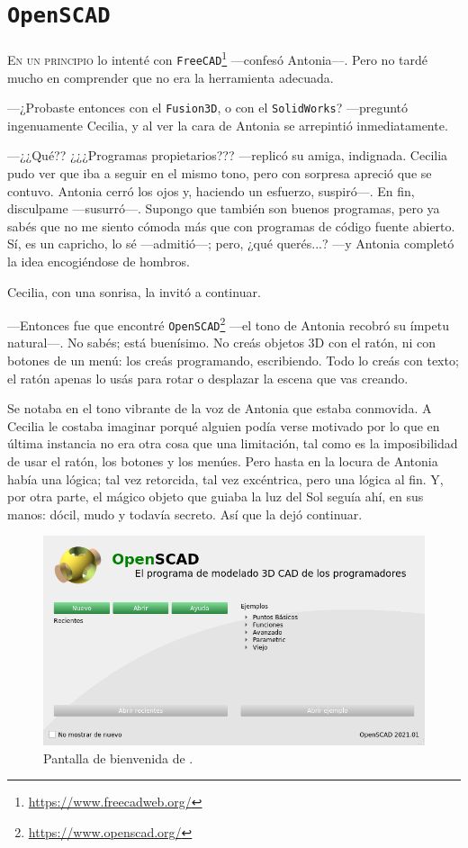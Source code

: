 \chapter[OpenSCAD]{\texttt{OpenSCAD}}

\lettrine[ante=\raisebox{-2ex}{\Large ---},lines=2]{E}{n un principio}
lo intenté con
\texttt{FreeCAD}\footnote{\url{https://www.freecadweb.org/}}
---confesó An\-to\-\mbox{nia---.} Pero no tardé mucho en comprender
que no era la herramienta adecuada.

---¿Probaste entonces con el \texttt{Fusion3D}, o con el
\texttt{Solid\-Works}? ---pre\-gun\-tó ingenuamente Cecilia, y al ver la
cara de Antonia se arrepintió inmediatamente.

---¿¿Qué??  ¿¿¿Programas propietarios???  ---replicó su amiga,
indignada. Cecilia pudo ver que iba a seguir en el mismo tono, pero
con sorpresa apreció que se contuvo. Antonia cerró los ojos y,
haciendo un esfuerzo, suspiró---. En fin, disculpame
---susurró---. Supongo que también son buenos programas, pero ya sabés
que no me siento cómoda más que con programas de código fuente
abierto. Sí, es un capricho, lo sé ---admitió---; pero, ¿qué
querés...? ---y Antonia completó la idea encogiéndose de hombros.

Cecilia, con una sonrisa, la invitó a continuar.

---Entonces fue que encontré
\texttt{OpenSCAD}\footnote{\url{https://www.openscad.org/}} ---el tono
de Antonia recobró su ímpetu natural---. No sabés; está buenísimo. No
creás objetos 3D con el ratón, ni con botones de un menú: los creás
programando, escribiendo. Todo lo creás con texto; el ratón apenas lo
usás para rotar o desplazar la escena que vas creando.

Se notaba en el tono vibrante de la voz de Antonia que estaba
conmovida. A Cecilia le costaba imaginar porqué alguien podía verse
motivado por lo que en última instancia no era otra cosa que una
limitación, tal como es la imposibilidad de usar el ratón, los botones
y los menúes. Pero hasta en la locura de Antonia había una lógica; tal
vez retorcida, tal vez excéntrica, pero una lógica al fin. Y, por otra
parte, el mágico objeto que guiaba la luz del Sol seguía ahí, en sus
manos: dócil, mudo y todavía secreto. Así que la dejó continuar.

\begin{figure}[ht]
  \centering  
  \includegraphics[width=.85\textwidth]{imagenes/openscad-bienvenida}  
  \caption{Pantalla de bienvenida de \openscad.}
\end{figure}

